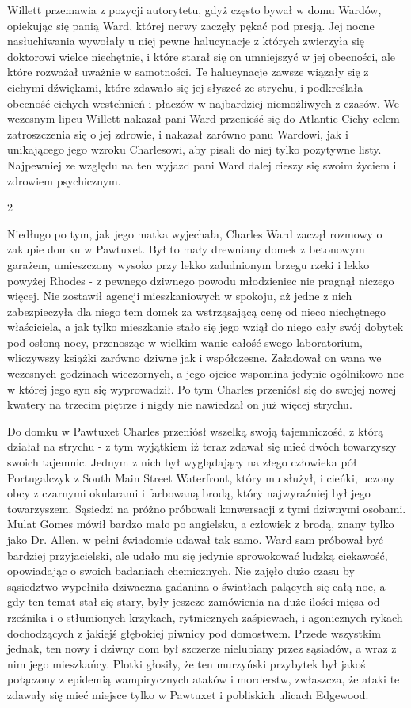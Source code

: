 Willett przemawia z pozycji autorytetu, gdyż często bywał w domu Wardów, opiekując się panią Ward, której nerwy zaczęły pękać pod presją. Jej nocne nasłuchiwania wywołały u niej pewne halucynacje z których zwierzyła się doktorowi wielce niechętnie, i które starał się on umniejszyć w jej obecności, ale które rozważał uważnie w samotności. Te halucynacje zawsze wiązały się z cichymi dźwiękami, które zdawało się jej słyszeć ze strychu, i podkreślała obecność cichych westchnień i płaczów w najbardziej niemożliwych z czasów. We wczesnym lipcu Willett nakazał pani Ward przenieść się do Atlantic Cichy celem zatroszczenia się o jej zdrowie, i nakazał zarówno panu Wardowi, jak i unikającego jego wzroku Charlesowi, aby pisali do niej tylko pozytywne listy.  Najpewniej ze względu na ten wyjazd pani Ward dalej cieszy się swoim życiem i zdrowiem psychicznym. 

\begin{center}
2
\end{center}

Niedługo po tym, jak jego matka wyjechała, Charles Ward zaczął rozmowy o zakupie domku w Pawtuxet. Był to mały drewniany domek z betonowym garażem, umieszczony wysoko przy lekko zaludnionym brzegu rzeki i lekko powyżej Rhodes - z pewnego dziwnego powodu młodzieniec nie pragnął niczego więcej. Nie zostawił agencji mieszkaniowych w spokoju, aż jedne z nich zabezpieczyła dla niego tem domek za wstrząsającą cenę od nieco niechętnego właściciela, a jak tylko mieszkanie stało się jego wziął do niego cały swój dobytek pod osłoną nocy, przenosząc w wielkim wanie całość swego laboratorium, wliczywszy książki zarówno dziwne jak i współczesne. Załadował on wana we wczesnych godzinach wieczornych, a jego ojciec wspomina jedynie ogólnikowo noc w której jego syn się wyprowadził. Po tym Charles przeniósł się do swojej nowej kwatery na trzecim piętrze i nigdy nie nawiedzał on już więcej strychu.

Do domku w Pawtuxet Charles przeniósł wszelką swoją tajemniczość, z którą działał na strychu - z tym wyjątkiem iż teraz zdawał się mieć dwóch towarzyszy swoich tajemnic. Jednym z nich był wyglądający na złego człowieka pół Portugalczyk z South Main Street Waterfront, który mu służył, i cieńki, uczony obcy z czarnymi okularami i farbowaną brodą, który najwyraźniej był jego towarzyszem. Sąsiedzi na próżno próbowali konwersacji z tymi dziwnymi osobami. Mulat Gomes mówił bardzo mało po angielsku, a człowiek z brodą, znany tylko jako Dr. Allen, w pełni świadomie udawał tak samo. Ward sam próbował być bardziej przyjacielski, ale udało mu się jedynie sprowokować ludzką ciekawość, opowiadając o swoich badaniach chemicznych. Nie zajęło dużo czasu by sąsiedztwo wypełniła dziwaczna gadanina o światłach palących się całą noc, a gdy ten temat stał się stary, były jeszcze zamówienia na duże ilości mięsa od rzeźnika i o stłumionych krzykach, rytmicznych zaśpiewach, i agonicznych rykach dochodzących z jakiejś głębokiej piwnicy pod domostwem. Przede wszystkim jednak, ten nowy i dziwny dom był szczerze nielubiany przez sąsiadów, a wraz z nim jego mieszkańcy. Plotki głosiły, że ten murzyński przybytek był jakoś połączony z epidemią wampirycznych ataków i morderstw, zwłaszcza, że ataki te zdawały się mieć miejsce tylko w Pawtuxet i pobliskich ulicach Edgewood. 

